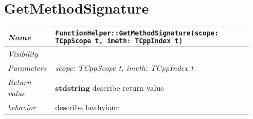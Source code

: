  \section{GetMethodSignature}
\begin{longtable}{p{3cm} @{\hskip 1cm} p{12cm}}
 \hline
\textit{Name} & \texttt{FunctionHelper::GetMethodSignature(scope: TCppScope t, imeth: TCppIndex t)}\\
\hline
 \textit{Visibility} & \\
\hline
\textit{Parameters} & \textit{scope: TCppScope t, imeth: TCppIndex t}\\
\hline
\textit{Return value} & \textbf{ stdstring} describe return value\\
  \hline
 \textit{behavior} & describe beahviour \\
\hline
\end{longtable} \pagebreak
